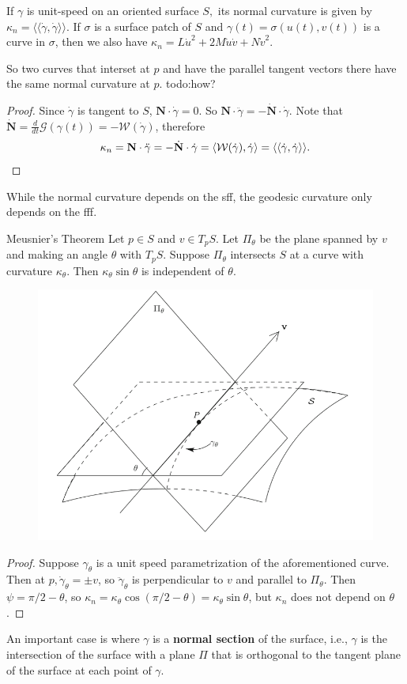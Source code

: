 \begin{prop}
    If $\gamma $ is unit-speed on an oriented surface $S,$ its normal curvature is given by $\kappa_n =\langle \langle \dot \gamma ,\dot \gamma  \rangle  \rangle $. If $\sigma$ is a surface patch of $S$ and $\gamma (t)=\sigma(u(t),v(t))$ is a curve in $\sigma$, then we also have $\kappa_n =L\dot u^2+2M\dot u \dot v+N\dot v^2$.
\end{prop}
So two curves that interset at $p$ and have the parallel tangent vectors there have the same normal curvature at $p$. {\color{red}todo:how?} 
\begin{proof}
    Since $\dot \gamma $ is tangent to $S$, $\mathbf N \cdot \dot \gamma =0$. So $\mathbf N\cdot \ddot \gamma =-\dot{\mathbf N} \cdot \dot \gamma $. Note that $\dot{\mathbf N} = \frac{d}{dt}\mathcal{G} (\gamma (t))=-\mathcal{W} (\dot \gamma )$, therefore\[
        \kappa_n =\mathbf N\cdot \ddot \gamma =-\dot{\mathbf N} \cdot \dot \gamma =\langle \mathcal{W} (\dot \gamma ),\dot \gamma  \rangle =\langle \langle \dot \gamma ,\dot \gamma  \rangle  \rangle .\qedhere
    \] 
\end{proof}
While the normal curvature depends on the sff, the geodesic curvature only depends on the fff. 
\begin{namedthm}{Meusnier's Theorem} 
   Let $p \in S$ and $v \in T_p S$. Let $\Pi _{\theta}$ be the plane spanned by $v$ and making an angle $\theta$ with $T_p S$. Suppose $\Pi_{\theta}$ intersects $S$ at a curve with curvature $\kappa_{\theta}$. Then $\kappa_{\theta}\sin \theta$ is independent of $\theta$.
\begin{figure}[H]
\centering
\includegraphics[width=0.6\linewidth]{figures/dgeo_4.2.png}
\end{figure}
\end{namedthm}
\begin{proof}
    Suppose $\gamma _{\theta}$ is a unit speed parametrization of the aforementioned curve. Then at $p, \dot \gamma _{\theta}=\pm v$, so $\ddot \gamma _{\theta}$ is perpendicular to $v$ and parallel to $\Pi_{\theta}$. Then $\psi = \pi /2 -\theta$, so $\kappa_n =\kappa_{\theta}\cos(\pi /2-\theta)=\kappa_{\theta}\sin \theta$, but $\kappa_n $ does not depend on $\theta$.
\end{proof}
An important case is where $\gamma $ is a \textbf{normal section} of the surface, i.e., $\gamma $ is the intersection of the surface with a plane $\Pi$ that is orthogonal to the tangent plane of the surface at each point of $\gamma $.

